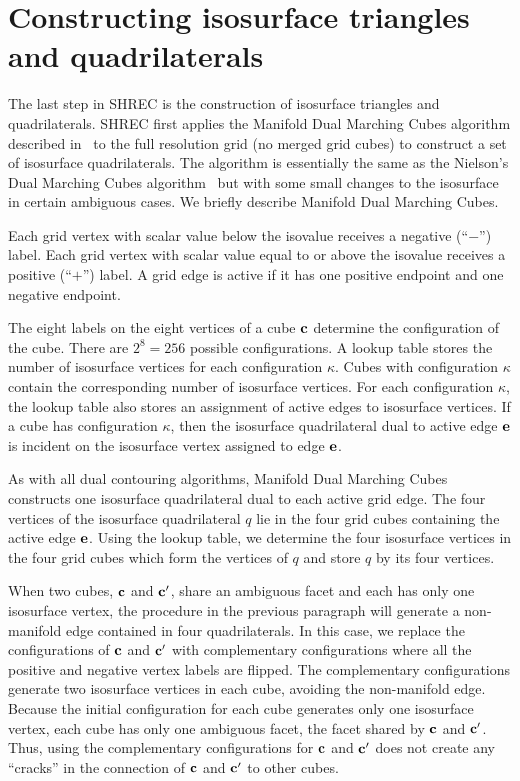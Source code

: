 \section{Constructing isosurface triangles and quadrilaterals}
\label{section:isoPoly}

The last step in SHREC is the construction of isosurface triangles
and quadrilaterals.
SHREC first applies the Manifold Dual Marching Cubes algorithm
described in~\cite{Wenger:2013:Isosurfaces}
to the full resolution grid (no merged grid cubes)
to construct a set of isosurface quadrilaterals.
The algorithm is essentially the same 
as the Nielson's Dual Marching Cubes algorithm~\cite{n-dmc-04}
but with some small changes to the isosurface
in certain ambiguous cases.
We briefly describe Manifold Dual Marching Cubes.

Each grid vertex with scalar value below the isovalue 
receives a negative (``$-$'') label.
Each grid vertex with scalar value equal to or above the isovalue 
receives a positive (``$+$'') label.
A grid edge is active if
it has one positive endpoint and one negative endpoint.

The eight labels on the eight vertices of a cube $\mathbf{c}$
determine the configuration of the cube.
There are $2^8 = 256$ possible configurations.
A lookup table stores the number of isosurface vertices 
for each configuration $\kappa$.
Cubes with configuration $\kappa$ 
contain the corresponding number of isosurface vertices.
For each configuration $\kappa$,
the lookup table also stores an assignment of active edges
to isosurface vertices.
If a cube has configuration $\kappa$,
then the isosurface quadrilateral dual to active edge $\mathbf{e}$
is incident on the isosurface vertex assigned to edge $\mathbf{e}$.

As with all dual contouring algorithms,
Manifold Dual Marching Cubes constructs one isosurface quadrilateral
dual to each active grid edge.
The four vertices of the isosurface quadrilateral $q$
lie in the four grid cubes containing the active edge $\mathbf{e}$.
Using the lookup table, we determine the four isosurface vertices
in the four grid cubes which form the vertices of $q$
and store $q$ by its four vertices.

When two cubes, $\mathbf{c}$ and $\mathbf{c}'$, 
share an ambiguous facet and each has only one
isosurface vertex, the procedure in the previous paragraph
will generate a non-manifold edge contained in four quadrilaterals.
In this case, we replace the configurations of $\mathbf{c}$ and $\mathbf{c}'$
with complementary configurations where all the positive and negative
vertex labels are flipped.
The complementary configurations generate two isosurface vertices
in each cube, avoiding the non-manifold edge.
Because the initial configuration for each cube
generates only one isosurface vertex,
each cube has only one ambiguous facet,
the facet shared by $\mathbf{c}$ and $\mathbf{c}'$.
Thus, using the complementary configurations for $\mathbf{c}$ and $\mathbf{c}'$
does not create any ``cracks'' in the connection of $\mathbf{c}$ and $\mathbf{c}'$
to other cubes.

